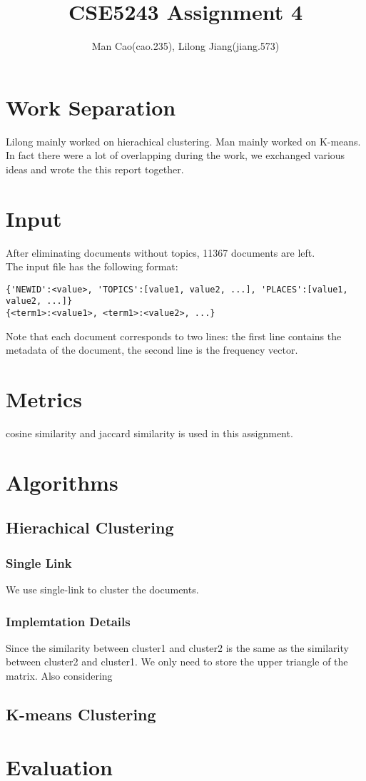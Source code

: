 \documentclass{article}
\begin{document}
\title{CSE5243 Assignment 4}
\author{Man Cao(cao.235), Lilong Jiang(jiang.573)}
\maketitle

\section{Work Separation}
Lilong mainly worked on hierachical clustering. Man mainly worked on
K-means. In fact there were a lot of overlapping during the
work, we exchanged various ideas and wrote the this report together.
\section{Input}
After eliminating documents without topics, 11367 documents are left.\\
The input file has the following format:
\begin{verbatim}
{'NEWID':<value>, 'TOPICS':[value1, value2, ...], 'PLACES':[value1, value2, ...]}
{<term1>:<value1>, <term1>:<value2>, ...}
\end{verbatim}
Note that each document corresponds to two lines: the first line contains the
metadata of the document, the second line is the frequency vector.

\section{Metrics}
cosine similarity and jaccard similarity is used in this assignment.

\section{Algorithms}
\subsection{Hierachical Clustering}
\subsubsection{Single Link}
We use single-link to cluster the documents.
\subsubsection{Implemtation Details}
Since the similarity between cluster1 and cluster2 is the same as the similarity between cluster2 and cluster1. We only need to store the upper triangle of the matrix. Also considering 
\subsection{K-means Clustering}
\section{Evaluation}
\end{document}
